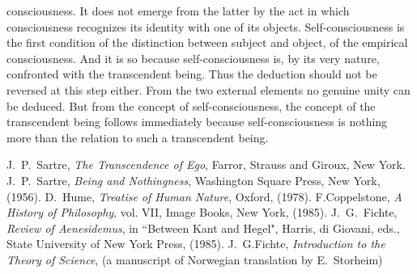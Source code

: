 consciousness. It does not emerge from the latter by the act in which consciousness recognizes its identity with 
one of its objects. Self-consciousness is the first condition of the distinction between subject and object, of the 
empirical consciousness. And it is so because self-consciousness is, by its very nature, confronted with the 
transcendent being. Thus the deduction should not be reversed at this step either. From the two external elements 
no genuine unity can be deduced. But from the concept of self-consciousness, the concept of the transcendent being 
follows immediately because self-consciousness is nothing more than the relation to such a transcendent being.

\begin{thebibliography}{}
 J.~P.~Sartre, {\em The Transcendence of Ego}, Farror, Strauss and Giroux,
New York.
 J.~P.~Sartre, {\em Being and Nothingness}, Washington Square Press,
New York, (1956).
 D.~Hume, {\em Treatise of Human Nature}, Oxford, (1978).
 F.Coppelstone, {\em A History of Philosophy}, vol. VII, Image Books,
New York, (1985).
 J.~G.~Fichte, {\em Review of Aenesidemus}, in ``Between Kant and Hegel",
Harris, di Giovani, eds., State University of New York Press, (1985).
 J.~G.Fichte, {\em Introduction to the Theory of Science}, (a manuscript of Norwegian translation by E.~Storheim)
\end{thebibliography}



